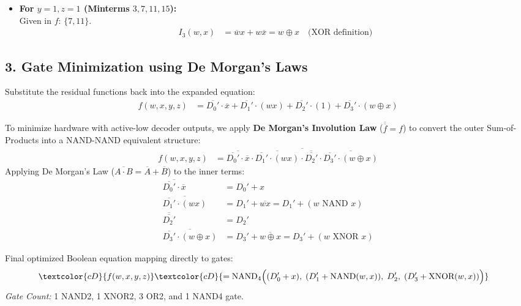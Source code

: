 \documentclass[12pt,a3paper]{article}
\begin{document}
\begin{enumerate}
\begin{tcolorbox}[enhanced,breakable,ansbox,colback=cD!4,colframe=cD,boxrule=0.8pt,arc=5pt,title={\textbf{Answer}},fonttitle=\bfseries\color{white},colbacktitle=cD]
\begin{itemize}
    \item \textbf{For $y=1, z=1$ (Minterms $3, 7, 11, 15$):}\\
    Given in $f$: $\{7, 11\}$.
    \begin{align*}
        I_3(w, x) &= \overline{w}x + w\overline{x} = w \oplus x \quad \text{(XOR definition)}
    \end{align*}
\end{itemize}

\subsection*{3. Gate Minimization using De Morgan's Laws}
Substitute the residual functions back into the expanded equation:
\begin{align*}
    f(w, x, y, z) &= \overline{D_0'} \cdot \overline{x} + \overline{D_1'} \cdot (wx) + \overline{D_2'} \cdot (1) + \overline{D_3'} \cdot (w \oplus x)
\end{align*}

To minimize hardware with active-low decoder outputs, we apply \textbf{De Morgan's Involution Law} ($\overline{\overline{f}} = f$) to convert the outer Sum-of-Products into a NAND-NAND equivalent structure:
\begin{align*}
    f(w, x, y, z) &= \overline{ \overline{\overline{D_0'} \cdot \overline{x}} \cdot \overline{\overline{D_1'} \cdot (wx)} \cdot \overline{\overline{D_2'}} \cdot \overline{\overline{D_3'} \cdot (w \oplus x)} }
\end{align*}
Applying De Morgan's Law ($\overline{A \cdot B} = \overline{A} + \overline{B}$) to the inner terms:
\begin{align*}
    \overline{\overline{D_0'} \cdot \overline{x}} &= D_0' + x \\
    \overline{\overline{D_1'} \cdot (wx)} &= D_1' + \overline{wx} = D_1' + (w \text{ NAND } x)\\
    \overline{\overline{D_2'}} &= D_2' \\
    \overline{\overline{D_3'} \cdot (w \oplus x)} &= D_3' + \overline{w \oplus x} = D_3' + (w \text{ XNOR } x)
\end{align*}

Final optimized Boolean equation mapping directly to gates:
\begin{align*}
    \textcolor{cD}{f(w, x, y, z)} &\textcolor{cD}{= \text{NAND}_4 \Big( (D_0' + x),\; (D_1' + \text{NAND}(w,x)),\; D_2',\; (D_3' + \text{XNOR}(w,x)) \Big)}
\end{align*}
\textit{Gate Count:} 1 NAND2, 1 XNOR2, 3 OR2, and 1 NAND4 gate.


\end{tcolorbox}
\end{enumerate}
\end{document}
